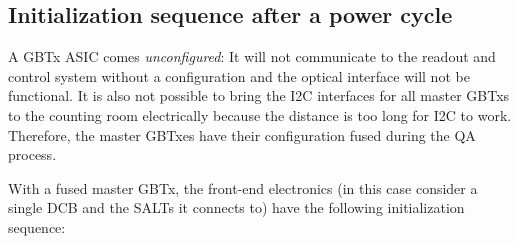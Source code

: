 \subsection{Initialization sequence after a power cycle}
\label{dcb-init}

A GBTx ASIC comes \emph{unconfigured}:
It will not communicate to the readout and control system without a
configuration and the optical interface will not be functional.
It is also not possible to bring the I2C interfaces for all master GBTxs
to the counting room electrically because the distance is too long for I2C to
work.
Therefore, the master GBTxes have their configuration fused during the QA
process.

With a fused master GBTx, the front-end electronics
(in this case consider a single DCB and the SALTs it connects to) have the
following initialization sequence:

